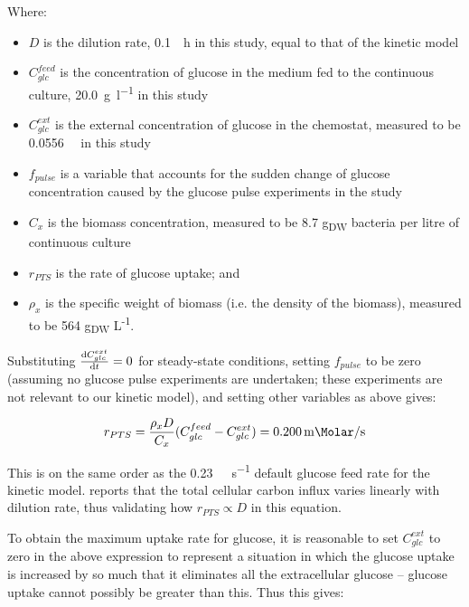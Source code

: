 \documentclass[parskip=full, numbers=noenddot]{scrreprt}
\begin{document}
Where:

\begin{itemize}
\item $D$ is the dilution rate, \SI{0.1}{\per\hour} in this study, equal to that of the kinetic model
\item $C_{glc}^{feed}$ is the concentration of glucose in the medium fed to the continuous culture, \SI{20.0}{\gram\per\litre} in this study
\item $C_{glc}^{ext}$ is the external concentration of glucose in the chemostat, measured to be \SI{0.0556}{\milli\Molar} in this study
\item $f_{pulse}$ is a variable that accounts for the sudden change of glucose concentration caused by the glucose pulse experiments in the study
\item $C_{x}$ is the biomass concentration, measured to be 8.7 g\textsubscript{DW} bacteria per litre of continuous culture
\item $r_{PTS}$ is the rate of glucose uptake; and
  \item $\rho_{x}$ is the specific weight of biomass (i.e. the density of the biomass), measured to be 564 g\textsubscript{DW} L\textsuperscript{-1}.
  \end{itemize}

  Substituting $\dv{C_{glc}^{ext}}{t} = 0$ for steady-state conditions, setting $f_{pulse}$ to be zero (assuming no glucose pulse experiments are undertaken; these experiments are not relevant to our kinetic model), and setting other variables as above gives:

\begin{equation}
    r_{PTS} = \frac{\rho_{x}D}{C_{x}}(C_{glc}^{feed} - C_{glc}^{ext}) = \SI{0.200}{\milli\Molar\per\second}
  \end{equation}
  \label{eqn:chassagnole_rearranged}

  This is on the same order as the \SI{0.23}{\milli\Molar\per\second} default glucose feed rate for the kinetic model.  \citet{nanchen_nonlinear_2006} reports that the total cellular carbon influx varies linearly with dilution rate, thus validating how $r_{PTS} \propto D$ in this equation.

  To obtain the maximum uptake rate for glucose, it is reasonable to set $C_{glc}^{ext}$ to zero in the above expression to represent a situation in which the glucose uptake is increased by so much that it eliminates all the extracellular glucose -- glucose uptake cannot possibly be greater than this.  Thus this gives:
\end{document}

